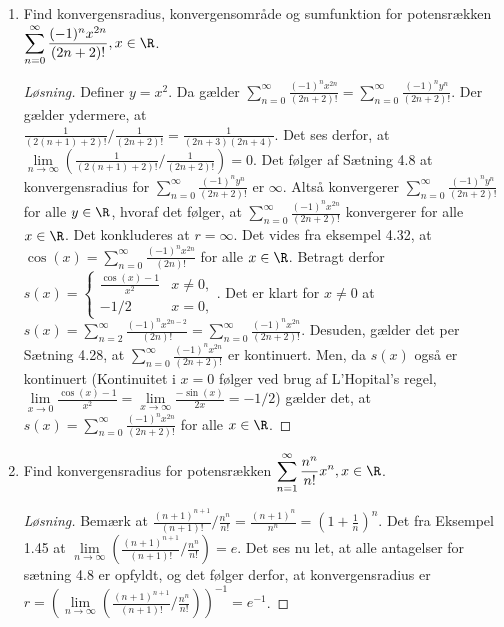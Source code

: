 \begin{opg}
\begin{enumerate}
		\item Find konvergensradius,  konvergensomr\aa{}de  og sumfunktion for potensrækken $\displaystyle \sum_{n=0}^{\infty}\frac{(-1)^nx^{2n}}{(2n+2)!} ,  x\in\R $. 
		\ifanswers
		\begin{proof}[Løsning]
			Definer $ y=x^2 $. Da gælder $ \sum_{n=0}^{\infty}\frac{(-1)^nx^{2n}}{(2n+2)!} =\sum_{n=0}^{\infty}\frac{(-1)^ny^{n}}{(2n+2)!}  $. Der gælder ydermere, at\\ $ \frac{1}{(2(n+1)+2)!}\Big/ \frac{1}{(2n+2)!}=\frac{1}{(2n+3)(2n+4)} $. Det ses derfor, at $ \lim\limits_{n\to\infty}\left(\frac{1}{(2(n+1)+2)!}\Big/ \frac{1}{(2n+2)!}\right)=0 $. Det følger af Sætning 4.8 at konvergensradius for $ \sum_{n=0}^{\infty}\frac{(-1)^ny^{n}}{(2n+2)!} $ er $ \infty $. Altså konvergerer $ \sum_{n=0}^{\infty}\frac{(-1)^ny^{n}}{(2n+2)!} $ for alle $ y\in \R $, hvoraf det følger, at $ \sum_{n=0}^{\infty}\frac{(-1)^nx^{2n}}{(2n+2)!} $ konvergerer for alle $ x\in \R $. Det konkluderes at $ r=\infty $. Det vides fra eksempel 4.32, at $ \cos(x)=\sum_{n=0}^{\infty}\frac{(-1)^nx^{2n}}{(2n)!} $ for alle $ x\in \R $. Betragt derfor $ s(x)=\begin{cases}
			\frac{\cos(x)-1}{x^2}& x\neq 0,\\
			-1/2& x=0,
			\end{cases} $. Det er klart for $ x\neq 0 $ at $ s(x)=\sum_{n=2}^{\infty}\frac{(-1)^nx^{2n-2}}{(2n)!}=\sum_{n=0}^{\infty}\frac{(-1)^nx^{2n}}{(2n+2)!} $. Desuden, gælder det per Sætning 4.28, at $ \sum_{n=0}^{\infty}\frac{(-1)^nx^{2n}}{(2n+2)!} $ er kontinuert. Men, da $ s(x) $ også er kontinuert (Kontinuitet i $ x=0 $ følger ved brug af L'Hopital's regel, $ \lim\limits_{x\to 0}\frac{\cos(x)-1}{x^2}=\lim\limits_{x\to\infty}\frac{-\sin(x)}{2x}=-1/2 $) gælder det, at $ s(x)=\sum_{n=0}^{\infty}\frac{(-1)^nx^{2n}}{(2n+2)!} $ for alle $ x\in\R $.
		\end{proof}
		\fi
		
		\item Find konvergensradius for potensrækken $\displaystyle \sum_{n=1}^{\infty}\frac{n^n}{n!}x^n, x\in\R $.
		\ifanswers
		\begin{proof}[Løsning]
			Bemærk at $ \frac{(n+1)^{n+1}}{(n+1)!}\Big/ \frac{n^n}{n!}=\frac{(n+1)^n}{n^n}=\left(1+\frac{1}{n}\right)^n $. Det fra Eksempel 1.45 at $ \lim\limits_{n\to\infty}\left(\frac{(n+1)^{n+1}}{(n+1)!}\Big/ \frac{n^n}{n!}\right)=e $.
			Det ses nu let, at alle antagelser for sætning 4.8 er opfyldt, og det følger derfor, at konvergensradius er $ r=\left(\lim\limits_{n\to\infty}\left(\frac{(n+1)^{n+1}}{(n+1)!}\Big/ \frac{n^n}{n!}\right)\right)^{-1}=e^{-1}  $.
		\end{proof}
		\fi
	\end{enumerate}
\end{opg}


